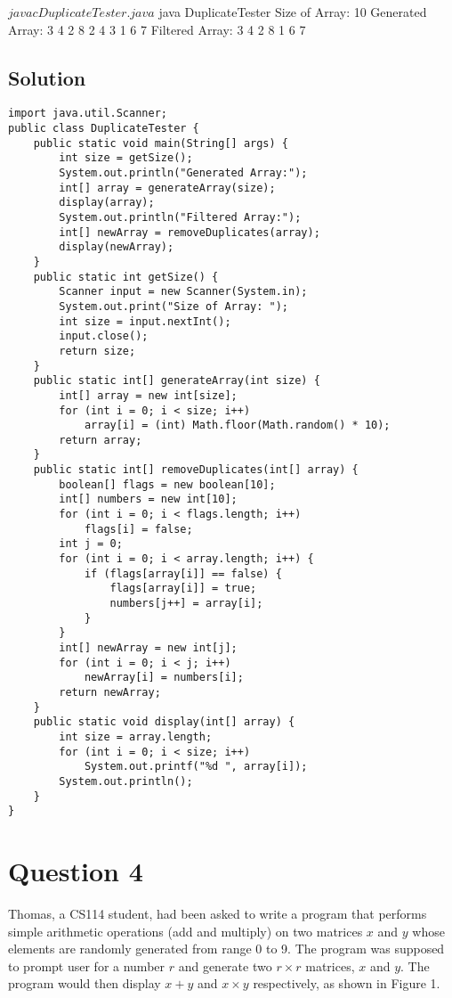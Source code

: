 \begin{terminal}
$ javac DuplicateTester.java
$ java DuplicateTester
Size of Array: 10
Generated Array:
3 4 2 8 2 4 3 1 6 7
Filtered Array:
3 4 2 8 1 6 7
\end{terminal}

\subsection*{Solution}

\lstset{language=Java,tabsize=4}
\begin{lstlisting}
import java.util.Scanner;
public class DuplicateTester {
	public static void main(String[] args) {
		int size = getSize();
		System.out.println("Generated Array:");
		int[] array = generateArray(size);
		display(array);
		System.out.println("Filtered Array:");
		int[] newArray = removeDuplicates(array);
		display(newArray);
	}
	public static int getSize() {
		Scanner input = new Scanner(System.in);
		System.out.print("Size of Array: ");
		int size = input.nextInt();
		input.close();
		return size;
	}
	public static int[] generateArray(int size) {
		int[] array = new int[size];
		for (int i = 0; i < size; i++)
			array[i] = (int) Math.floor(Math.random() * 10);
		return array;
	}
	public static int[] removeDuplicates(int[] array) {
		boolean[] flags = new boolean[10];
		int[] numbers = new int[10];
		for (int i = 0; i < flags.length; i++)
			flags[i] = false;
		int j = 0;
		for (int i = 0; i < array.length; i++) {
			if (flags[array[i]] == false) {
				flags[array[i]] = true;
				numbers[j++] = array[i];
			}
		}
		int[] newArray = new int[j];
		for (int i = 0; i < j; i++)
			newArray[i] = numbers[i];
		return newArray;
	}
	public static void display(int[] array) {
		int size = array.length;
		for (int i = 0; i < size; i++)
			System.out.printf("%d ", array[i]);
		System.out.println();
	}
}
\end{lstlisting}

\section*{Question 4}
Thomas, a CS114 student, had been asked to write a program that performs simple arithmetic operations (add and multiply) on two matrices $x$ and $y$ whose elements are randomly generated from range 0 to 9.
The program was supposed to prompt user for a number $r$ and generate two $r \times r$ matrices, $x$ and $y$.
The program would then display $x + y$ and $x \times y$ respectively, as shown in Figure 1.

